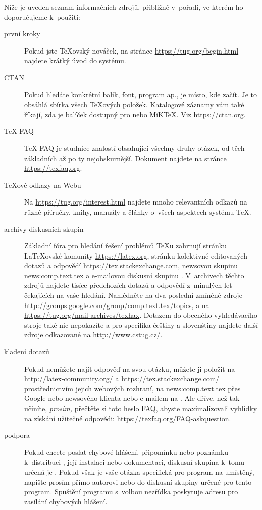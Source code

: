 \documentclass[\classoptions,slovak,english,czech]{\classname}
\newcommand{\ctt}{\url{news:comp.text.tex}}
\begin{document}
Níže je uveden seznam informačních zdrojů, přibližně v~pořadí, ve kterém
ho doporučujeme k~použití:
\begin{description}
\item [první kroky] Pokud jste \TeX ovský nováček, na stránce
\url{https://tug.org/begin.html} najdete krátký úvod do systému.

\item [CTAN] Pokud hledáte konkrétní balík,
  font, program ap., \CTAN{} je místo, kde začít.
  Je to obsáhlá sbírka všech \TeX{}ových položek. Katalogové záznamy vám také říkají, zda je
  balíček dostupný pro \TL{} nebo MiK\TeX. Viz
  \url{https://ctan.org}.

\item [\TeX{} FAQ] \TeX{} FAQ je studnice
znalostí obsahující všechny druhy otázek, od těch základních až po 
ty nejobskurnější. Dokument najdete na stránce  \url{https://texfaq.org}.

\item [\TeX{}ové odkazy na Webu] Na \url{https://tug.org/interest.html}
  najdete mnoho relevantních odkazů na různé příručky,
  knihy, manuály a články o~všech aspektech systému \TeX{}.

\item [archivy diskusních skupin]
  Základní fóra pro hledání řešení problémů \TeX{}u zahrnují 
  stránku \LaTeX{}ovské komunity \url{https://latex.org}, 
  stránku kolektivně editovaných dotazů a odpovědí \url{https://tex.stackexchange.com},
  newsovou skupinu \ctt{} a e-mailovou diskusní
  skupinu . V~archivech těchto zdrojů
  najdete tisíce předchozích dotazů a odpovědí z~minulých let čekajících na vaše
  hledání. Nahlédněte na dva poslední zmíněné zdroje
  \url{http://groups.google.com/group/comp.text.tex/topics}, a na
  \url{https://tug.org/mail-archives/texhax}. Dotazem do obecného
  vyhledávacího stroje %
  také nic nepokazíte a pro specifika češtiny a slovenštiny najdete další zdroje
  odkazované na \url{http://www.cstug.cz/}.
  
\item [kladení dotazů] Pokud nemůžete najít odpověď na svou otázku,
  můžete ji položit na \url{http://latex-community.org/} a
  \url{https://tex.stackexchange.com/} prostřednictvím jejich webových rozhraní, 
  na \ctt{} přes Google nebo newsového klienta nebo e-mailem na .
  Ale dříve, než tak učiníte, \emph{prosím,} přečtěte si toto heslo FAQ,
  abyste maximalizovali vyhlídky na získání užitečné odpovědi:
  \url{https://texfaq.org/FAQ-askquestion}.

\item [podpora \TL{}] Pokud chcete poslat
  chybové hlášení, připomínku nebo poznámku k~distribuci
  \TL{}, její instalaci nebo dokumentaci,
  diskusní skupina k~tomu určená je .
  Pokud však je vaše otázka specifická pro program na
  \TL{} umístěný, napište prosím přímo autorovi nebo do diskusní
  skupiny určené pro tento program. Spuštění programu 
  s~volbou  nezřídka
  poskytuje adresu pro zasílání chybových hlášení.
\end{description}
\end{document}
